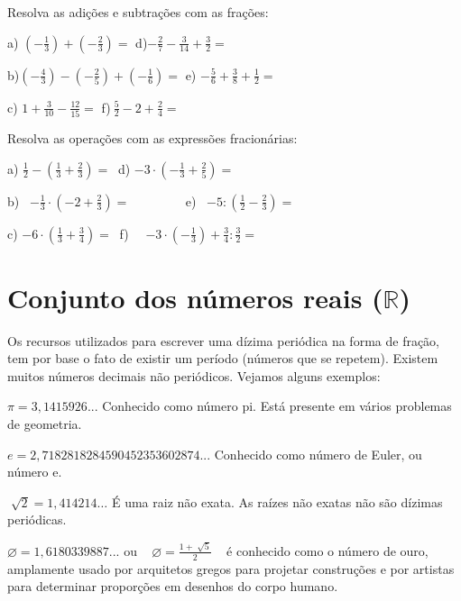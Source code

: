 \begin{exercicios}

	\exitem{} Resolva as adições e subtrações com as frações:

a)\textbf{  \(  \left( -\frac{1}{3} \right) + \left( -\frac{2}{3} \right) = \) \quad \quad \quad }d){\fontsize{16pt}{19.2pt}\selectfont   \( -\frac{2}{7}-\frac{3}{14}+\frac{3}{2}= \) }

b){\fontsize{16pt}{19.2pt}\selectfont   \(  \left( -\frac{4}{3} \right) - \left( -\frac{2}{5} \right) + \left( -\frac{1}{6} \right) = \) \quad e)  \( -\frac{5}{6}+\frac{3}{8}+\frac{1}{2}= \) }

c)  \( 1+\frac{3}{10}-\frac{12}{15}= \) \quad \quad \quad f){\fontsize{16pt}{19.2pt}\selectfont   \( ~\frac{5}{2}-2+\frac{2}{4}= \) }

	\exitem{} Resolva as operações com as expressões fracionárias:

a)\textbf{  \( \frac{1}{2}- \left( \frac{1}{3}+\frac{2}{3} \right) =~  \) \quad \quad \quad }d)\textbf{  \( -3 \cdot  \left( -\frac{1}{3}+\frac{2}{5} \right) =~  \) \quad }

b)~  \( -\frac{1}{3} \cdot  \left( -2+\frac{2}{3} \right) =~  \) ~~~~~~~ \quad \quad e)~  \( -5: \left( \frac{1}{2}-\frac{2}{3} \right) =~~  \) 

c)  \( -6 \cdot  \left( \frac{1}{3}+\frac{3}{4} \right) =~  \) \quad \quad \quad f)~~  \( -3 \cdot  \left( -\frac{1}{3} \right) +\frac{3}{4}:\frac{3}{2}=~  \) ~~~~~~~ 
\end{exercicios}

\section{Conjunto dos números reais ($\mathbb{R}$)}

Os recursos utilizados para escrever uma dízima periódica na forma de fração, tem por base o fato de existir um período (números que se repetem). Existem muitos números decimais não periódicos. Vejamos alguns exemplos:

$ \pi = 3,1415926$... Conhecido como número pi. Está presente em vários problemas de geometria.

$e = 2,7182818284590452353602874$... Conhecido como número de Euler, ou número e.

 \( \sqrt[]{2}=1,414214 \ldots  \)  É uma raiz não exata. As raízes não exatas não são dízimas periódicas.

$\varnothing =1,6180339887$... ou ~  \(  \varnothing =\frac{1+\sqrt[]{5}}{2} \) ~ é conhecido como o número de ouro, amplamente usado por arquitetos gregos para projetar construções e por artistas para determinar proporções em desenhos do corpo humano. 


